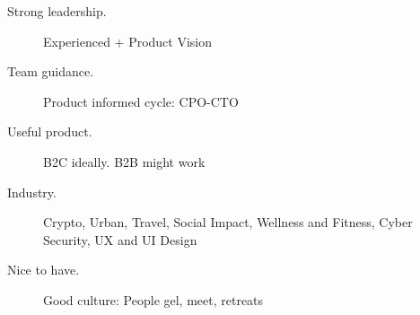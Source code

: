 \documentclass[10pt, a4paper, twocolumn]{article}
\begin{document}
\begin{description}
 \item[Strong leadership.] Experienced + Product Vision
  \item[Team guidance.] Product informed cycle: CPO-CTO
 \item[Useful product.] B2C ideally. B2B might work
  \item[Industry.]
  Crypto,
  Urban,
  Travel,
  Social Impact,
  Wellness and Fitness,
  Cyber Security,
  UX and UI Design \\
  \item[Nice to have.]
 Good culture: People gel, meet, retreats %
\end{description}














%


%
%
%
\end{document}
